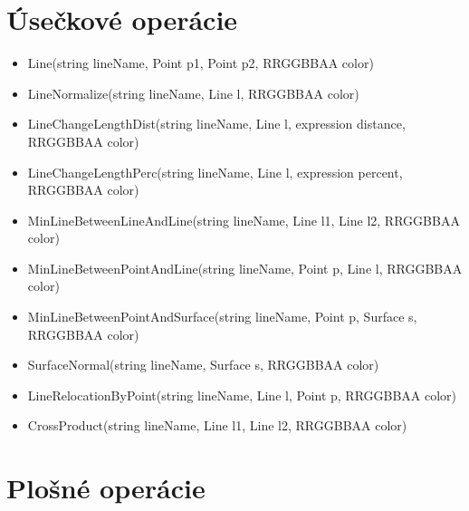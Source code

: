 \section*{Úsečkové operácie}
		
\begin{itemize}
		\item Line(string lineName, Point p1, Point p2, RRGGBBAA color) 

		\item LineNormalize(string lineName, Line l, RRGGBBAA color)

		\item LineChangeLengthDist(string lineName, Line l, expression distance, RRGGBBAA color)
		
		\item LineChangeLengthPerc(string lineName, Line l, expression percent, RRGGBBAA color) 



		
		\item MinLineBetweenLineAndLine(string lineName, Line l1, Line l2, RRGGBBAA color)
		
		\item MinLineBetweenPointAndLine(string lineName, Point p, Line l, RRGGBBAA color)
		
		\item MinLineBetweenPointAndSurface(string lineName, Point p, Surface s, RRGGBBAA color)


		\item SurfaceNormal(string lineName, Surface s, RRGGBBAA color) 



		\item LineRelocationByPoint(string lineName, Line l, Point p, RRGGBBAA color)


		\item CrossProduct(string lineName, Line l1, Line l2, RRGGBBAA color)

\end{itemize}

\section*{Plošné operácie}

